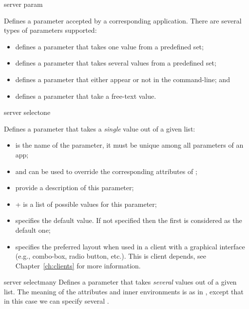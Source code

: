 \bigskip
\xmlstruct
{server}
{param}
{
%
  Defines a parameter accepted by a corresponding application. There
  are several types of parameters supported:
\begin{itemize}
\item {} defines a parameter that takes one
  value from a predefined set;
\item {} defines a parameter that takes several
  values from a predefined set;
\item {} defines a parameter that either appear or
  not in the command-line; and
\item {} defines a parameter that take a
  free-text value.
\end{itemize}
%
}


\bigskip
\xmlstruct
{server}
{selectone}
{%
%
  Defines a parameter that takes a \emph{single} value out of a given
  list:

  \begin{itemize}
  \item {} is the name of the parameter, it must be
    unique among all parameters of an app;

  \item {} and  can be used
    to override the corresponding attributes of
    ;

  \item {} provide a description of this parameter;

  \item {}+ is a list of possible values for
    this parameter;

  \item {} specifies the default value. If
    not specified then the first  is considered
    as the default one;

  \item {} specifies the preferred layout when
    used in a client with a graphical interface (e.g., combo-box,
    radio button, etc.). This is client depends, see
    Chapter~\ref{ch:clients} for more information.

  \end{itemize}
%
}


\bigskip
\xmlstruct
{server}
{selectmany}
{%
%
  Defines a parameter that takes \emph{several} values out of a given
  list. The meaning of the attributes and inner environments is as in
  , except that in this case we can specify
  several  .
%
}


